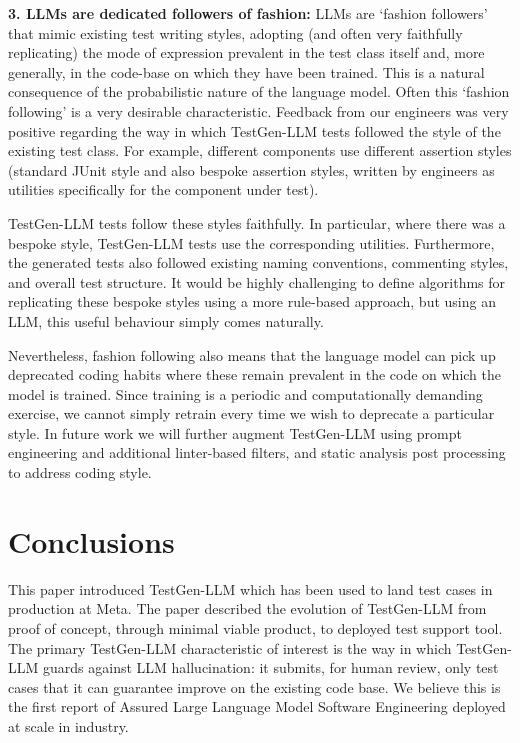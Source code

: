 \documentclass[sigconf,screen]{acmart}
\begin{document}
\medskip
\noindent
{\bf 
3. LLMs are dedicated followers of fashion: 
}
LLMs are `fashion followers' that mimic existing test writing styles,  adopting (and often very faithfully replicating) the mode of expression prevalent in the  test class itself and, more generally, in the code-base on which they have been trained. 
This is a natural consequence of the probabilistic nature of the language model.
Often this `fashion following' is a very desirable characteristic.
Feedback from our engineers was very positive regarding the way in which TestGen-LLM tests followed the style of the existing test class.
For example, different components use different assertion styles (standard JUnit style and also bespoke assertion styles, written by engineers as utilities specifically for the component under test).

TestGen-LLM tests follow these styles faithfully. 
In particular, where there was a bespoke style, TestGen-LLM tests use the corresponding utilities.
Furthermore, the generated tests also followed existing naming conventions, commenting styles, and overall test structure.
It would be highly challenging to define algorithms for replicating these bespoke styles using a more rule-based approach, but using an LLM, this useful behaviour simply comes naturally.

Nevertheless, fashion following also means that the language model can pick up deprecated coding habits where these remain prevalent in the code on which the model is trained.
Since training is a periodic and computationally demanding exercise, we cannot simply retrain every time we wish to deprecate a particular style.
In future work we will further augment TestGen-LLM using prompt engineering and additional linter-based filters, and static analysis post processing to address coding style.






\section{Conclusions}
This paper introduced TestGen-LLM which has been used to land test cases in production at Meta.
The paper described the evolution of TestGen-LLM from proof of concept, through minimal viable product, to deployed test support tool.
The primary TestGen-LLM characteristic of interest is the way in which TestGen-LLM guards against LLM hallucination: it  submits, for human review, only test cases that it can guarantee improve on the existing code base.
We believe this is the first report of Assured Large Language Model Software Engineering deployed at scale in industry.
\end{document}
